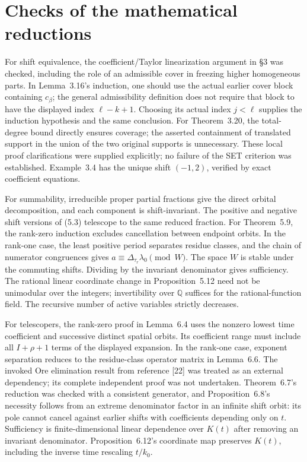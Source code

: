 \documentclass[10pt]{article}
\begin{document}
\section*{Checks of the mathematical reductions}
For shift equivalence, the coefficient/Taylor linearization argument in §3 was checked, including the role of an admissible cover in freezing higher homogeneous parts. In Lemma 3.16’s induction, one should use the actual earlier cover block containing \(c_\beta\); the general admissibility definition does not require that block to have the displayed index \(\ell-k+1\). Choosing its actual index \(j<\ell\) supplies the induction hypothesis and the same conclusion. For Theorem 3.20, the total-degree bound directly ensures coverage; the asserted containment of translated support in the union of the two original supports is unnecessary. These local proof clarifications were supplied explicitly; no failure of the SET criterion was established. Example 3.4 has the unique shift \((-1,2)\), verified by exact coefficient equations.\par
For summability, irreducible proper partial fractions give the direct orbital decomposition, and each component is shift-invariant. The positive and negative shift versions of (5.3) telescope to the same reduced fraction. For Theorem 5.9, the rank-zero induction excludes cancellation between endpoint orbits. In the rank-one case, the least positive period separates residue classes, and the chain of numerator congruences gives \(a\equiv\Delta_{\tau_r}\lambda_0\pmod W\). The space \(W\) is stable under the commuting shifts. Dividing by the invariant denominator gives sufficiency. The rational linear coordinate change in Proposition 5.12 need not be unimodular over the integers; invertibility over \(\mathbb Q\) suffices for the rational-function field. The recursive number of active variables strictly decreases.\par
For telescopers, the rank-zero proof in Lemma 6.4 uses the nonzero lowest time coefficient and successive distinct spatial orbits. Its coefficient range must include all \(I+\rho+1\) terms of the displayed expansion. In the rank-one case, exponent separation reduces to the residue-class operator matrix in Lemma 6.6. The invoked Ore elimination result from reference [22] was treated as an external dependency; its complete independent proof was not undertaken. Theorem 6.7’s reduction was checked with a consistent generator, and Proposition 6.8’s necessity follows from an extreme denominator factor in an infinite shift orbit: its pole cannot cancel against earlier shifts with coefficients depending only on \(t\). Sufficiency is finite-dimensional linear dependence over \(K(t)\) after removing an invariant denominator. Proposition 6.12’s coordinate map preserves \(K(t)\), including the inverse time rescaling \(t/k_0\).\par
\end{document}
